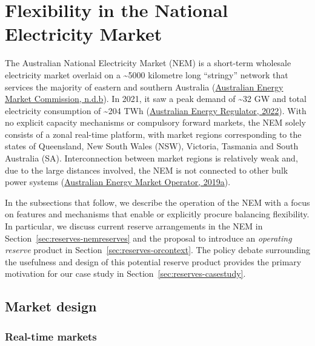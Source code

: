 \documentclass[12pt,a4paper,]{report}
\begin{document}
\hypertarget{sec:reserves-flexnem}{%
\section{Flexibility in the National Electricity
Market}\label{sec:reserves-flexnem}}

The Australian National Electricity Market (NEM) is a short-term
wholesale electricity market overlaid on a \textasciitilde5000 kilometre
long ``stringy'' network that services the majority of eastern and
southern Australia
(\protect\hyperlink{ref-australianenergymarketcommissionElectricitySupplyChain}{Australian
Energy Market Commission, n.d.b}). In 2021, it saw a peak demand of
\textasciitilde32 GW and total electricity consumption of
\textasciitilde204 TWh
(\protect\hyperlink{ref-australianenergyregulatorStateEnergyMarket2022}{Australian
Energy Regulator, 2022}). With no explicit capacity mechanisms or
compulsory forward markets, the NEM solely consists of a zonal real-time
platform, with market regions corresponding to the states of Queensland,
New South Wales (NSW), Victoria, Tasmania and South Australia (SA).
Interconnection between market regions is relatively weak and, due to
the large distances involved, the NEM is not connected to other bulk
power systems
(\protect\hyperlink{ref-australianenergymarketoperatorMaintainingPowerSystem2019}{Australian
Energy Market Operator, 2019a}).

In the subsections that follow, we describe the operation of the NEM
with a focus on features and mechanisms that enable or explicitly
procure balancing flexibility. In particular, we discuss current reserve
arrangements in the NEM in Section~\ref{sec:reserves-nemreserves} and
the proposal to introduce an \emph{operating reserve} product in
Section~\ref{sec:reserves-orcontext}. The policy debate surrounding the
usefulness and design of this potential reserve product provides the
primary motivation for our case study in
Section~\ref{sec:reserves-casestudy}.

\hypertarget{market-design}{%
\subsection{Market design}\label{market-design}}

\hypertarget{real-time-markets}{%
\subsubsection{Real-time markets}\label{real-time-markets}}
\end{document}
